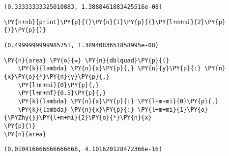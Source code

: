     \begin{Verbatim}[commandchars=\\\{\}]
(0.33333333325010883, 1.3888461883425516e-08)
    \end{Verbatim}

    \begin{tcolorbox}[breakable, size=fbox, boxrule=1pt, pad at break*=1mm,colback=cellbackground, colframe=cellborder]
\begin{Verbatim}[commandchars=\\\{\}]
\PY{n+nb}{print}\PY{p}{(}\PY{n}{I}\PY{p}{(}\PY{l+m+mi}{2}\PY{p}{)}\PY{p}{)}
\end{Verbatim}
\end{tcolorbox}

    \begin{Verbatim}[commandchars=\\\{\}]
(0.4999999999985751, 1.3894083651858995e-08)
    \end{Verbatim}

    \begin{tcolorbox}[breakable, size=fbox, boxrule=1pt, pad at break*=1mm,colback=cellbackground, colframe=cellborder]
\begin{Verbatim}[commandchars=\\\{\}]
\PY{n}{area} \PY{o}{=} \PY{n}{dblquad}\PY{p}{(}
    \PY{k}{lambda} \PY{n}{x}\PY{p}{,} \PY{n}{y}\PY{p}{:} \PY{n}{x}\PY{o}{*}\PY{n}{y}\PY{p}{,} 
    \PY{l+m+mi}{0}\PY{p}{,} 
    \PY{l+m+mf}{0.5}\PY{p}{,} 
    \PY{k}{lambda} \PY{n}{x}\PY{p}{:} \PY{l+m+mi}{0}\PY{p}{,} 
    \PY{k}{lambda} \PY{n}{x}\PY{p}{:} \PY{l+m+mi}{1}\PY{o}{\PYZhy{}}\PY{l+m+mi}{2}\PY{o}{*}\PY{n}{x}
\PY{p}{)}
\PY{n}{area}
\end{Verbatim}
\end{tcolorbox}

            \begin{tcolorbox}[breakable, size=fbox, boxrule=.5pt, pad at break*=1mm, opacityfill=0]
\begin{Verbatim}[commandchars=\\\{\}]
(0.010416666666666668, 4.101620128472366e-16)
\end{Verbatim}
\end{tcolorbox}
